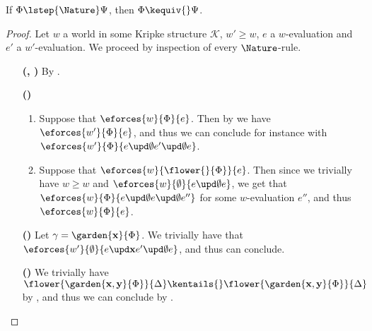 \begin{lemma}
  If $\Phi \lstep{\Nature} \Psi$, then $\Phi \kequiv{} \Psi$.
\end{lemma}
\begin{proof}
  Let $w$ a world in some Kripke structure $\mathcal{K}$, $w' \geq w$, $e$
  a $w$-evaluation and $e'$ a $w'$-evaluation. We proceed by inspection of every
  $\Nature$-rule.
  
  \begin{itemize}
    \item[\textbf{(\rsf{poll{\da}}, \rsf{poll{\ua}})}]
      By .
    
    \item[\textbf{(\rsf{epis})}]\sbr
    \begin{enumerate}
      \item Suppose that $\eforces{w}{\Phi}{e}$. Then by 
      we have $\eforces{w'}{\Phi}{e}$, and thus we can conclude for instance with
    $\eforces{w'}{\Phi}{\update{e}{\emptyset}{\update{e'}{\emptyset}{e}}}$.
      \item Suppose that $\eforces{w}{\flower{{}}{\Phi}}{e}$. Then since we
      trivially have $w \geq w$ and
      $\eforces{w}{\emptyset}{\update{e}{\emptyset}{e}}$, we get that
      $\eforces{w}{\Phi}{\update{e}{\emptyset}{\update{e}{\emptyset}{e''}}}$
      for some $w$-evaluation $e''$, and thus $\eforces{w}{\Phi}{e}$.
    \end{enumerate}

    \item[\textbf{(\rsf{epet})}]
      Let $\gamma = \garden{\bx}{\Phi}$. We trivially have that
      $\eforces{w'}{\emptyset}{\update{e}{\bx}{\update{e'}{\emptyset}{e}}}$,
      and thus can conclude.

    \item[\textbf{(\rsf{ipis})}] We trivially have $\flower{\garden{\bx,\by}{\Phi}}{\Delta}
      \kentails{}\flower{\garden{\bx,\by}{\Phi}}{\Delta}$ by
      , and thus we can conclude by
      .


\end{itemize}
\end{proof}
